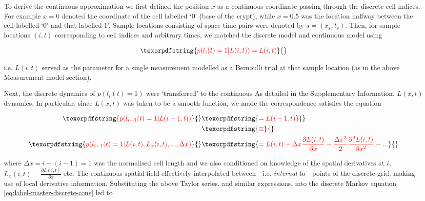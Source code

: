 \documentclass[10pt,letterpaper]{article}
\providecommand{\DIFaddtex}[1]{{\protect\color{blue} \sf #1}} %
\providecommand{\DIFdeltex}[1]{{\protect\color{red} \scriptsize #1}} %
\providecommand{\DIFaddbegin}{} %
\providecommand{\DIFaddend}{} %
\providecommand{\DIFdelbegin}{} %
\providecommand{\DIFdelend}{} %
\providecommand{\DIFadd}[1]{\texorpdfstring{\DIFaddtex{#1}}{#1}} %
\providecommand{\DIFdel}[1]{\texorpdfstring{\DIFdeltex{#1}}{}} %
\begin{document}
\DIFdelbegin \DIFdel{To derive the continuous approximation we first defined the position
\(x\) as a continuous coordinate passing through the discrete cell
indices. For example \(x = 0\) denoted the coordinate of the cell
labelled `0' (base of the crypt), while \(x = 0.5\) was the location
halfway between the cell labelled `0' and that labelled 1'. Sample
locations consisting of space-time pairs were denoted by
\(s = (x_s,t_s)\). Then, for sample locations \((i,t)\) corresponding to
cell indices and arbitrary times, we matched the discrete model and
continuous model using
}%

\begin{displaymath}\DIFdel{p(l_i(t)=1|L(i,t)) = L(i,t)%
}\end{displaymath}

\DIFdel{i.e. \(L(i,t)\) served as the parameter for a single measurement
modelled as a Bernoulli trial at that sample location (as in the above
Measurement model section).
}%

\DIFdel{Next, the discrete dynamics of \(p(l_i(t)=1)\) were `transferred' to the
continuous }\DIFdelend \DIFaddbegin \DIFadd{As detailed in the Supplementary Information, }\DIFaddend \(L(x,t)\) \DIFdelbegin \DIFdel{dynamics. In particular, since \(L(x,t)\) was
taken to be a smooth function, we made the
correspondence
}\DIFdelend \DIFaddbegin \DIFadd{satisfies the
equation
}\DIFaddend 

\DIFdelbegin \begin{align*}\DIFdel{p(l_{i-1}(t)=1|L(i-1,t)) }&\DIFdel{= L(i-1,t) \nonumber }\\ &\DIFdel{\equiv \nonumber}\\ \DIFdel{p(l_{i-1}(t)=1|L(i,t),L_x(i,t),...,\Delta x) }&\DIFdel{= L(i,t)-\Delta x \frac{\partial L(i,t)}{\partial x}+\frac{\Delta x^2}{2} \frac{\partial^2 L(i,t)}{\partial x^2} - ...}\end{align*}

\DIFdel{where \(\Delta x = i-(i-1) = 1\) was the normalised cell length and we
also conditioned on knowledge of the spatial derivatives at \(i\),
\(L_x(i,t) = \frac{\partial L(i,t)}{\partial x}\) etc. The continuous
spatial field effectively interpolated between - i.e. \emph{internal} to
- points of the discrete grid, making use of local derivative
information. Substituting the above Taylor series, and similar
expressions, into the discrete Markov equation
\ref{eq:label-master-discrete-cons} led to
}%
\end{document}
